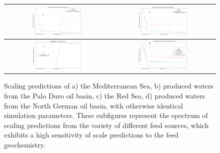 \begin{figure}[h]
    \centering
    \begin{tabular}{c|c}
        \includegraphics[width=0.49\textwidth]{images/ROSSpy/sensitivity_analyses/feed_source/Mediterranean.png} &
        \includegraphics[width=0.49\textwidth]{images/ROSSpy/sensitivity_analyses/feed_source/Palo_Duro_basin.png} \\ \midrule
        \includegraphics[width=0.49\textwidth]{images/ROSSpy/sensitivity_analyses/feed_source/Red_Sea.png} & \includegraphics[width=0.49\textwidth]{images/ROSSpy/sensitivity_analyses/feed_source/German_Basin.png} \\ \bottomrule
    \end{tabular}
    \caption{
        Scaling predictions of a) the Mediterranean Sea, b) produced waters from the Palo Duro oil basin, c) the Red Sea, d) produced waters from the North German oil basin, with otherwise identical simulation parameters. These subfigures represent the spectrum of scaling predictions from the variety of different feed sources, which exhibits a high sensitivity of scale predictions to the feed geochemistry. 
    }
    \label{feed_sources}
\end{figure}

